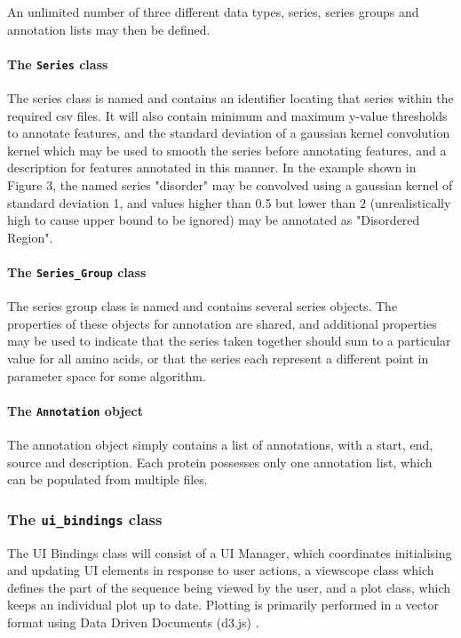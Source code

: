 \documentclass[fleqn,10pt]{article} %
\begin{document}
An unlimited number of three different data types, series, series groups and annotation lists may then be defined.

\paragraph{The \texttt{Series} class}

The series class is named and contains an identifier locating that series within the required csv files. It will also contain minimum and maximum y-value thresholds to annotate features, and the standard deviation of a gaussian kernel convolution kernel which may be used to smooth the series before annotating features, and a description for features annotated in this manner. In the example shown in Figure 3, the named series "disorder" may be convolved using a gaussian kernel of standard deviation 1, and values higher than 0.5 but lower than 2 (unrealistically high to cause upper bound to be ignored) may be annotated as "Disordered Region".

\paragraph{The \texttt{Series\_Group} class}

The series group class is named and contains several series objects. The properties of these objects for annotation are shared, and additional properties may be used to indicate that the series taken together should sum to a particular value for all amino acids, or that the series each represent a different point in parameter space for some algorithm.

\paragraph{The \texttt{Annotation} object}

The annotation object simply contains a list of annotations, with a start, end, source and description. Each protein possesses only one annotation list, which can be populated from multiple files.

\subsubsection{The \texttt{ui\_bindings} class}

The UI Bindings class will consist of a UI Manager, which coordinates initialising and updating UI elements in response to user actions, a viewscope class which defines the part of the sequence being viewed by the user, and a plot class, which keeps an individual plot up to date. Plotting is primarily performed in a vector format using Data Driven Documents (d3.js) \cite{Bostock2011}. 
\end{document}

